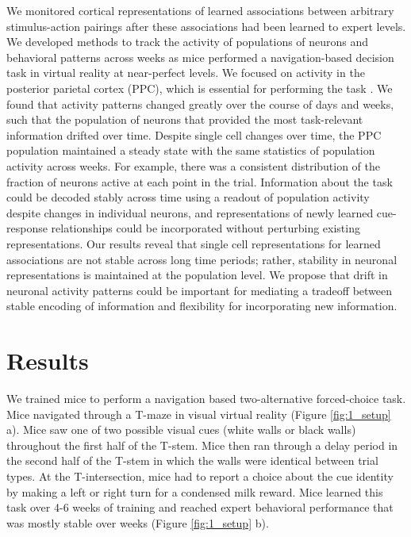We monitored cortical representations of learned associations between arbitrary stimulus-action pairings after these associations had been learned to expert levels. We developed methods to track the activity of populations of neurons and behavioral patterns across weeks as mice performed a navigation-based decision task in virtual reality at near-perfect levels. We focused on activity in the posterior parietal cortex (PPC), which is essential for performing the task \citep{Harvey:2012du, McNaughton1994, Nitz2006, Whitlock2012}. We found that activity patterns changed greatly over the course of days and weeks, such that the population of neurons that provided the most task-relevant information drifted over time. Despite single cell changes over time, the PPC population maintained a steady state with the same statistics of population activity across weeks. For example, there was a consistent distribution of the fraction of neurons active at each point in the trial. Information about the task could be decoded stably across time using a readout of population activity despite changes in individual neurons, and representations of newly learned cue-response relationships could be incorporated without perturbing existing representations. Our results reveal that single cell representations for learned associations are not stable across long time periods; rather, stability in neuronal representations is maintained at the population level. We propose that drift in neuronal activity patterns could be important for mediating a tradeoff between stable encoding of information and flexibility for incorporating new information.

\section{Results} \label{sec:chap3_results}

We trained mice to perform a navigation based two-alternative forced-choice task. Mice navigated through a T-maze in visual virtual reality  \citep{Harvey:2012du} (Figure \ref{fig:1_setup} a). Mice saw one of two possible visual cues (white walls or black walls) throughout the first half of the T-stem. Mice then ran through a delay period in the second half of the T-stem in which the walls were identical between trial types. At the T-intersection, mice had to report a choice about the cue identity by making a left or right turn for a condensed milk reward. Mice learned this task over 4-6 weeks of training and reached expert behavioral performance that was mostly stable over weeks (Figure \ref{fig:1_setup} b). 

